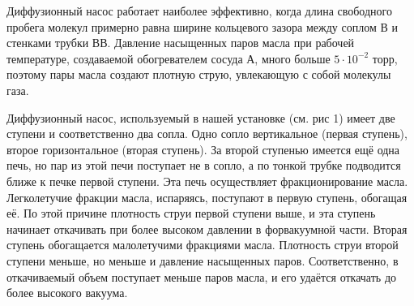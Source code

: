 \documentclass[12pt,a4paper]{article}
\begin{document}
Диффузионный насос работает наиболее эффективно, когда длина свободного пробега молекул примерно равна ширине кольцевого зазора между соплом В и стенками трубки ВВ. Давление насыщенных паров масла при рабочей температуре, создаваемой обогревателем сосуда А, много больше $5\cdot 10^{-2}$ торр, поэтому пары масла создают плотную струю, увлекающую с собой молекулы газа.

Диффузионный насос, используемый в нашей установке (см. рис 1) имеет две ступени и соответственно два сопла. Одно сопло вертикальное (первая ступень), второе горизонтальное (вторая ступень). За второй ступенью имеется ещё одна печь, но пар из этой печи поступает не в сопло, а по тонкой трубке подводится ближе к печке первой ступени. Эта печь осуществляет фракционирование масла. Легколетучие фракции масла, испаряясь, поступают в первую ступень, обогащая её. По этой причине плотность струи первой ступени выше, и эта ступень начинает откачивать при более высоком давлении в форвакуумной части. Вторая ступень обогащается малолетучими фракциями масла. Плотность струи второй ступени меньше, но меньше и давление насыщенных паров. Соответственно, в откачиваемый объем поступает меньше паров масла, и его удаётся откачать до более высокого вакуума.  \\
\end{document}
